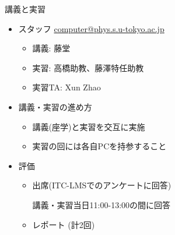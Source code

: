 \begin{frame}[t,fragile]{講義と実習}
  \begin{itemize}
  \item スタッフ \href{mailto:computer@phys.s.u-tokyo.ac.jp}{computer@phys.s.u-tokyo.ac.jp}
    \begin{itemize}
    \item 講義: 藤堂
    \item 実習: 高橋助教、藤澤特任助教
    \item 実習TA: Xun Zhao
    \end{itemize}
  \item 講義・実習の進め方
    \begin{itemize}
    \item 講義(座学)と実習を交互に実施
    \item 実習の回には各自PCを持参すること
    \end{itemize}
  \item 評価
    \begin{itemize}
    \item 出席(ITC-LMSでのアンケートに回答)

      講義・実習当日11:00-13:00の間に回答
      
    \item レポート (計2回)
    \end{itemize}    
  \end{itemize}    
\end{frame}
